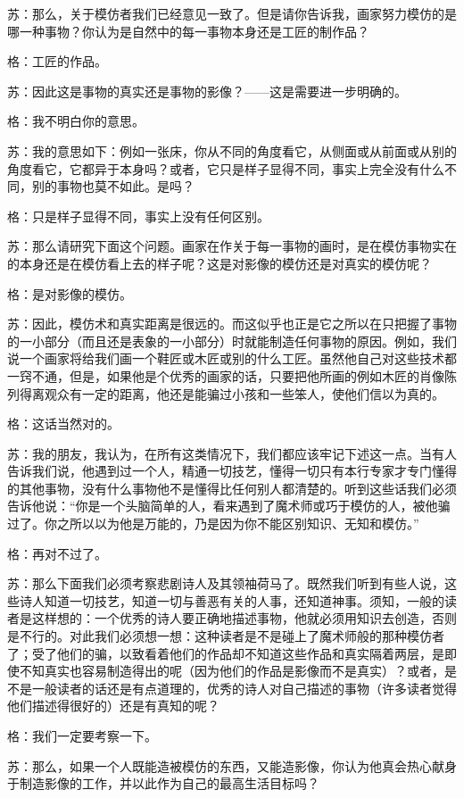 \documentclass[12pt,oneside]{book}
\begin{document}
苏：那么，关于模仿者我们已经意见一致了。但是请你告诉我，画家努力模仿的是哪一种事物？你认为是自然中的每一事物本身还是工匠的制作品？

格：工匠的作品。

苏：因此这是事物的真实还是事物的影像？——这是需要进一步明确的。

格：我不明白你的意思。

苏：我的意思如下：例如一张床，你从不同的角度看它，从侧面或从前面或从别的角度看它，它都异于本身吗？或者，它只是样子显得不同，事实上完全没有什么不同，别的事物也莫不如此。是吗？

格：只是样子显得不同，事实上没有任何区别。

苏：那么请研究下面这个问题。画家在作关于每一事物的画时，是在模仿事物实在的本身还是在模仿看上去的样子呢？这是对影像的模仿还是对真实的模仿呢？

格：是对影像的模仿。

苏：因此，模仿术和真实距离是很远的。而这似乎也正是它之所以在只把握了事物的一小部分（而且还是表象的一小部分）时就能制造任何事物的原因。例如，我们说一个画家将给我们画一个鞋匠或木匠或别的什么工匠。虽然他自己对这些技术都一窍不通，但是，如果他是个优秀的画家的话，只要把他所画的例如木匠的肖像陈列得离观众有一定的距离，他还是能骗过小孩和一些笨人，使他们信以为真的。

格：这话当然对的。

苏：我的朋友，我认为，在所有这类情况下，我们都应该牢记下述这一点。当有人告诉我们说，他遇到过一个人，精通一切技艺，懂得一切只有本行专家才专门懂得的其他事物，没有什么事物他不是懂得比任何别人都清楚的。听到这些话我们必须告诉他说：“你是一个头脑简单的人，看来遇到了魔术师或巧于模仿的人，被他骗过了。你之所以以为他是万能的，乃是因为你不能区别知识、无知和模仿。”

格：再对不过了。

苏：那么下面我们必须考察悲剧诗人及其领袖荷马了。既然我们听到有些人说，这些诗人知道一切技艺，知道一切与善恶有关的人事，还知道神事。须知，一般的读者是这样想的：一个优秀的诗人要正确地描述事物，他就必须用知识去创造，否则是不行的。对此我们必须想一想：这种读者是不是碰上了魔术师般的那种模仿者了；受了他们的骗，以致看着他们的作品却不知道这些作品和真实隔着两层，是即使不知真实也容易制造得出的呢（因为他们的作品是影像而不是真实）？或者，是不是一般读者的话还是有点道理的，优秀的诗人对自己描述的事物（许多读者觉得他们描述得很好的）还是有真知的呢？

格：我们一定要考察一下。

苏：那么，如果一个人既能造被模仿的东西，又能造影像，你认为他真会热心献身于制造影像的工作，并以此作为自己的最高生活目标吗？
\end{document}
